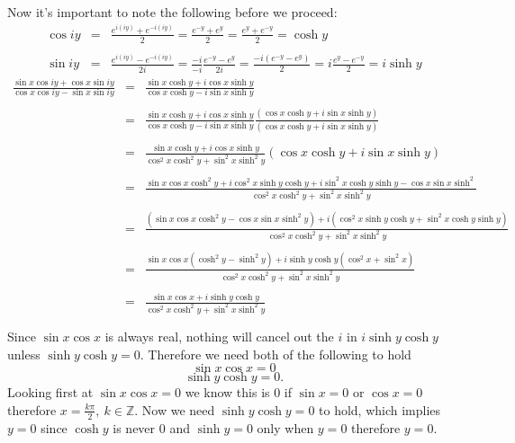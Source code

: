 \documentclass[10pt]{amsart}
\theoremstyle{nonumberplain}
\begin{document}
\begin{enumerate}[label={\bf {\arabic*}:}]
Now it's important to note the following before we proceed:
\begin{eqnarray*}
\cos iy &=& \frac{e^{i(iy)} + e^{-i(iy)}}{2}  = \frac{e^{-y} + e^{y}}{2} = \frac{e^{y} + e^{-y}}{2} =\cosh y \\ \\
\sin iy &=& \frac{e^{i(iy)} - e^{-i(iy)}}{2i} = \frac{-i}{-i} \frac{e^{-y} - e^{y}}{2i} = \frac{-i(e^{-y} - e^{y})}{2} = i \frac{e^{y} - e^{-y}}{2} = i \sinh y
\end{eqnarray*}
\begin{eqnarray*}
\frac{\sin x\cos iy + \cos x \sin iy }{\cos x \cos iy  - \sin x \sin iy} &=& \frac{\sin x\cosh y + i \cos x \sinh y }{\cos x \cosh y  - i\sin x \sinh y } \\ \\
&=& \frac{\sin x\cosh y + i \cos x \sinh y }{\cos x \cosh y  - i\sin x \sinh y } \frac{(\cos x \cosh y  + i\sin x \sinh y )}{(\cos x \cosh y  + i\sin x \sinh y )} \\ \\
&=& \frac{\sin x\cosh y + i \cos x \sinh y }{\cos^2 x \cosh^2 y  + \sin^2 x \sinh^2 y } (\cos x \cosh y  + i\sin x \sinh y ) \\ \\
&=& \frac{\sin x \cos x\cosh^2 y + i \cos^2 x \sinh y \cosh y + i\sin^2 x\cosh y \sinh y - \cos x \sin x  \sinh^2} {\cos^2 x \cosh^2 y  + \sin^2 x \sinh^2 y } \\ \\
&=& \frac{(\sin x \cos x\cosh^2 y - \cos x \sin x  \sinh^2 y) + i (\cos^2 x \sinh y \cosh y + \sin^2 x\cosh y \sinh y)} {\cos^2 x \cosh^2 y  + \sin^2 x \sinh^2 y } \\ \\
&=& \frac{\sin x \cos x(\cosh^2 y - \sinh^2 y) + i \sinh y \cosh y (\cos^2 x + \sin^2 x)} {\cos^2 x \cosh^2 y  + \sin^2 x \sinh^2 y } \\ \\
&=& \frac{\sin x \cos x + i \sinh y \cosh y} {\cos^2 x \cosh^2 y  + \sin^2 x \sinh^2 y } \\ \\
\end{eqnarray*}
Since $\sin x \cos x$ is always real, nothing will cancel out the $i$ in $i \sinh y \cosh y$ unless $\sinh y \cosh y = 0$.
Therefore we need both of the following to hold
$$ \sin x \cos x = 0 $$
$$ \sinh y \cosh y = 0. $$
Looking first at $ \sin x \cos x = 0 $ we know this is 0 if $\sin x = 0$ or $\cos x = 0$ therefore $x = \frac{k\pi}{2}, \: k \in \mathbb{Z}.$
Now we need $\sinh y \cosh y = 0$ to hold, which implies $y = 0$ since $\cosh y$ is never 0 and $\sinh y = 0$ only when $y = 0$ therefore $y = 0$.

\end{enumerate}
\end{document}
